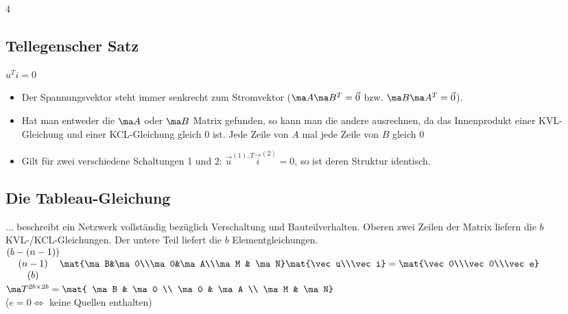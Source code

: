 \documentclass[fs, footer]{latex4ei}
\begin{document}
\begin{multicols*}{4}

    \subsection{Tellegenscher Satz}
    $u^Ti = 0$
    \begin{itemize}
        \item Der Spannungsvektor steht immer senkrecht zum Stromvektor ($\ma A\ma B^T = \vec 0$ bzw. $\ma B\ma A^T = \vec 0$).
        \item Hat man entweder die $\ma A$ oder $\ma B$ Matrix gefunden, so kann man die andere ausrechnen, da das Innenprodukt einer KVL-Gleichung und einer KCL-Gleichung gleich $0$ ist. Jede Zeile von $A$ mal jede Zeile von $B$ gleich $0$
        \item Gilt für zwei verschiedene Schaltungen 1 und 2: $\vec u^{(1), T} \vec i^{(2)}=0$, so ist deren Struktur identisch.
    \end{itemize}

    \subsection{Die Tableau-Gleichung}
    ... beschreibt ein Netzwerk vollständig bezüglich Verschaltung und Bauteilverhalten. Oberen zwei Zeilen der Matrix liefern die $b$ KVL-/KCL-Gleichungen. Der untere Teil liefert die $b$ Elementgleichungen.\\
    $\begin{matrix}(b-(n-1)) \\ (n-1) \\ (b)\end{matrix} \mat{\ma B&\ma 0\\\ma 0&\ma A\\\ma M & \ma N}\mat{\vec u\\\vec i} = \mat{\vec 0\\\vec 0\\\vec e}$\\
    $\ma T^{2b \times 2b} = \mat{ \ma B & \ma 0 \\ \ma 0 & \ma A \\ \ma M & \ma N}$\\
    ($e = 0 \Leftrightarrow$ keine Quellen enthalten)


\end{multicols*}
\end{document}
